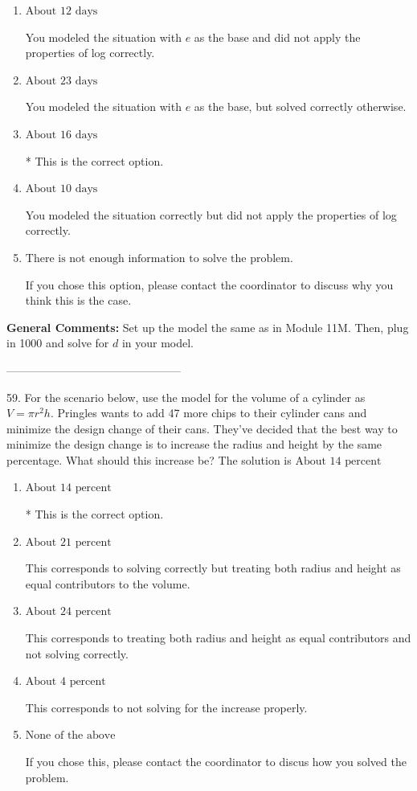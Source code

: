 \documentclass{extbook}[14pt]
\begin{document}
\begin{enumerate}[label=\Alph*.] 
\item $ \text{About } 12 \text{ days} $ 

 You modeled the situation with $e$ as the base and did not apply the properties of log correctly. 
\item $ \text{About } 23 \text{ days} $ 

 You modeled the situation with $e$ as the base, but solved correctly otherwise. 
\item $ \text{About } 16 \text{ days} $ 

 * This is the correct option. 
\item $ \text{About } 10 \text{ days} $ 

 You modeled the situation correctly but did not apply the properties of log correctly. 
\item $ \text{There is not enough information to solve the problem.} $ 

 If you chose this option, please contact the coordinator to discuss why you think this is the case. 
\end{enumerate} 
 
\textbf{General Comments:} Set up the model the same as in Module 11M. Then, plug in 1000 and solve for $d$ in your model.

-----------------------------------------------

59. For the scenario below, use the model for the volume of a cylinder as $V = \pi r^2 h$.
Pringles wants to add 47  more chips to their cylinder cans and minimize the design change of their cans. They've decided that the best way to minimize the design change is to increase the radius and height by the same percentage. What should this increase be? 
The solution is $ \text{About } 14 \text{ percent} $ 

\begin{enumerate}[label=\Alph*.] 
\item $ \text{About } 14 \text{ percent} $ 

 * This is the correct option. 
\item $ \text{About } 21 \text{ percent} $ 

 This corresponds to solving correctly but treating both radius and height as equal contributors to the volume. 
\item $ \text{About } 24 \text{ percent} $ 

 This corresponds to treating both radius and height as equal contributors and not solving correctly. 
\item $ \text{About } 4 \text{ percent} $ 

 This corresponds to not solving for the increase properly. 
\item $ \text{None of the above} $ 

 If you chose this, please contact the coordinator to discus how you solved the problem. 
\end{enumerate} 
 
\end{document}
